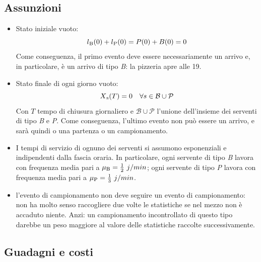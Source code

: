 \documentclass[a4paper, 12pt]{article}
\begin{document}
\subsection{Assunzioni}
\begin{itemize}
  \item Stato iniziale vuoto: 
  \[ 
    l\textsubscript{B}(0) + l\textsubscript{P}(0) = P(0) + B(0) = 0 
\]
  Come conseguenza, il primo evento deve essere necessariamente un arrivo e, in particolare, è un arrivo di tipo \textit{B}: la pizzeria apre alle 19.
  \item Stato finale di ogni giorno vuoto:
\[
    X\textsubscript{s}(T) = 0\ \ \ \forall s \in \mathcal{B} \cup \mathcal{P}
\]
  Con $T$ tempo di chiusura giornaliero e $\mathcal{B} \cup \mathcal{P}$ l'unione dell'insieme dei serventi di tipo \textit{B} e \textit{P}. Come conseguenza, l'ultimo evento non può essere un arrivo, e sarà quindi o una partenza o un campionamento.

  \item I tempi di servizio di ognuno dei serventi si assumono  esponenziali e indipendenti dalla fascia oraria. In particolare, ogni servente di tipo \textit{B} lavora con frequenza media pari a $\mu\textsubscript{B} = \frac{1}{2}\ j/min$; ogni servente di tipo \textit{P} lavora con frequenza media pari a $\mu\textsubscript{P} = \frac{1}{3}\ j/min$. 
  
\item l'evento di campionamento non deve seguire un evento di campionamento: non ha molto senso raccogliere due volte le statistiche se nel mezzo non è accaduto niente. Anzi: un campionamento incontrollato di questo tipo darebbe un peso maggiore al valore delle statistiche raccolte successivamente.
\end{itemize}

\subsection{Guadagni e costi}
\end{document}
